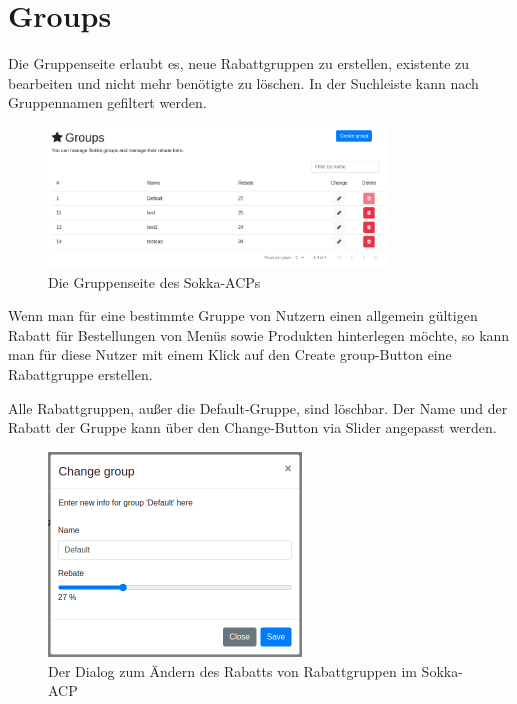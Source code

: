 \section{Groups}
\label{acp-groups}

Die Gruppenseite erlaubt es, neue Rabattgruppen zu erstellen, existente zu bearbeiten und nicht mehr benötigte zu löschen. In der Suchleiste kann nach Gruppennamen gefiltert werden.

\begin{figure}[ht]
    \centering
    \includegraphics[width=0.8\textwidth]{images/ACP/groups.png}
    \caption{Die Gruppenseite des Sokka-ACPs}
\end{figure}

Wenn man für eine bestimmte Gruppe von Nutzern einen allgemein gültigen Rabatt für Bestellungen von Menüs sowie Produkten hinterlegen möchte, so kann man für diese Nutzer mit einem Klick auf den \glqq Create group\grqq -Button eine Rabattgruppe erstellen.

Alle Rabattgruppen, außer die Default-Gruppe, sind löschbar. Der Name und der Rabatt der Gruppe kann über den \glqq Change\grqq -Button via Slider angepasst werden.

\begin{figure}[ht]
    \centering
    \includegraphics[width=0.6\textwidth]{images/ACP/groups_modal.png}
    \caption{Der Dialog zum Ändern des Rabatts von Rabattgruppen im Sokka-ACP}
\end{figure}